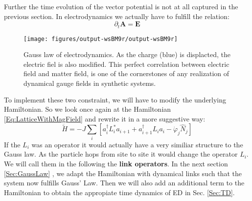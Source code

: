 \documentclass[10pt]{article}
\begin{document}
 Further the time evolution of the vector potential  is not at all captured in the previous section. In electrodynamics we actually have to fulfill the relation:
 \begin{equation}\label{Eq:MaxwellTime}
 \partial_t \mathbf{A} = \mathbf{E}
 \end{equation}
\begin{figure}[h!]
\begin{center}
\texttt{[image: figures/output-wsBM9r/output-wsBM9r]}
\caption{{Gauss law of electrodynamics. As the charge (blue) is displacted, the
electric fiel is also modified. This perfect correlation between
electric field and matter field, is one of the cornerstones of any
realization of dynamical gauge fields in synthetic systems.
{\label{333433}}%
}}
\end{center}
\end{figure}

 
 To implement these two constraint, we will have to modify the underlying Hamiltonian. So we look once again at the Hamiltonian \eqref{Eq:LatticeWithMagField} and rewrite it in a more suggestive way:
 \begin{equation}\label{eq:LatticeWithLink}
 \tilde{H} = -J\sum_i \left[a_i^\dag L^*_i a_{i+1} +a_{i+1}^\dag L_i a_i - \dot{\varphi}_j \hat{N}_j\right]
 \end{equation}
  If the $L_i$ was an operator it would actually have a very similiar structure to the Gauss law. As the particle hops from site to site it would change the operator $L_i$. We will call them in the following the \textbf{link operators}. In the next section \ref{Sec:GaussLaw} , we adapt the Hamiltonian with dynamical links such that the system now fulfills Gauss' Law.  Then we will also add an additional term to the Hamiltonian to obtain the appropiate time dynamics of ED in Sec. \ref{Sec:TD}.
\end{document}
